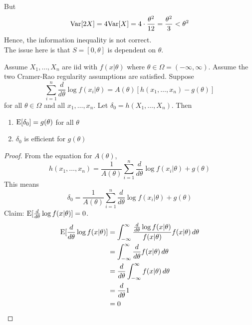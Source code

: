 \documentclass[12pt]{article}
\begin{document}
But $$ \mathrm{Var}[ 2X ] = 4\mathrm{Var}[ X ] = 4 \cdot \frac{\theta^2}{12} = \frac{\theta^2}{3} < \theta^2$$ Hence, the information inequality is not correct. \\ 
The issue here is that $S = [0,\theta]$ is dependent on $\theta$. 
\begin{theorem} Assume $X_1,\dots,X_n$ are iid with $f(x | \theta)$ where $\theta \in \Omega = (-\infty, \infty)$. Assume the two Cramer-Rao regularity assumptions are satisfied. Suppose $$ \sum_{i=1}^n \frac{d}{d\theta} \log f(x_i | \theta) = A(\theta)[h(x_1,\dots,x_n) - g(\theta)] $$ for all $\theta \in \Omega$ and all $x_1,\dots,x_n$. Let $\delta_ 0 = h(X_1,\dots,X_n)$. Then \begin{enumerate} 
\item $\mathrm{E}[ \delta_0 ] = g(\theta)$ for all $\theta$
\item $\delta_0$ is efficient for $g(\theta)$ \end{enumerate} \end{theorem} 
\begin{proof} From the equation for $A(\theta)$, $$ h(x_1,\dots,x_n) = \frac{1}{A(\theta)} \sum_{i=1}^n \frac{d}{d\theta} \log f(x_i | \theta) + g(\theta) $$ This means $$ \delta_0 = \frac{1}{A(\theta)} \sum_{i=1}^n \frac{d}{d\theta} \log f(x_i | \theta) + g(\theta) $$ Claim: $\mathrm{E}[ \frac{d}{d\theta} \log f(x | \theta) ] = 0$. $$ \begin{aligned} \mathrm{E}[ \frac{d}{d\theta} \log f(x | \theta) ] &= \int_{-\infty}^\infty \frac{\frac{d}{d\theta} \log f(x | \theta)}{f(x | \theta)} f(x | \theta) \, d \theta \\ &= \int_{-\infty}^\infty \frac{d}{d\theta} f(x|\theta) \, d\theta \\ &= \frac{d}{d\theta} \int_{-\infty}^\infty f(x | \theta) \, d\theta \\ &= \frac{d}{d\theta} 1 \\ &= 0 \end{aligned} $$ \end{proof} 
\end{document}

